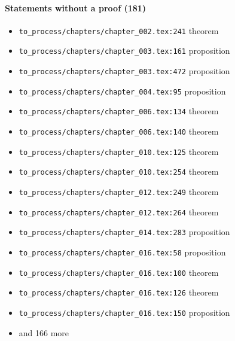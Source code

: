 \documentclass[11pt]{article}
\newcommand{\loc}[1]{{\small\color{muted}\texttt{#1}}}
\begin{document}
\paragraph{Statements without a proof (181)}
\begin{itemize}
\item \loc{to\_process/\allowbreak{}chapters/\allowbreak{}chapter\_002.tex:241} theorem
\item \loc{to\_process/\allowbreak{}chapters/\allowbreak{}chapter\_003.tex:161} proposition
\item \loc{to\_process/\allowbreak{}chapters/\allowbreak{}chapter\_003.tex:472} proposition
\item \loc{to\_process/\allowbreak{}chapters/\allowbreak{}chapter\_004.tex:95} proposition
\item \loc{to\_process/\allowbreak{}chapters/\allowbreak{}chapter\_006.tex:134} theorem
\item \loc{to\_process/\allowbreak{}chapters/\allowbreak{}chapter\_006.tex:140} theorem
\item \loc{to\_process/\allowbreak{}chapters/\allowbreak{}chapter\_010.tex:125} theorem
\item \loc{to\_process/\allowbreak{}chapters/\allowbreak{}chapter\_010.tex:254} theorem
\item \loc{to\_process/\allowbreak{}chapters/\allowbreak{}chapter\_012.tex:249} theorem
\item \loc{to\_process/\allowbreak{}chapters/\allowbreak{}chapter\_012.tex:264} theorem
\item \loc{to\_process/\allowbreak{}chapters/\allowbreak{}chapter\_014.tex:283} proposition
\item \loc{to\_process/\allowbreak{}chapters/\allowbreak{}chapter\_016.tex:58} proposition
\item \loc{to\_process/\allowbreak{}chapters/\allowbreak{}chapter\_016.tex:100} theorem
\item \loc{to\_process/\allowbreak{}chapters/\allowbreak{}chapter\_016.tex:126} theorem
\item \loc{to\_process/\allowbreak{}chapters/\allowbreak{}chapter\_016.tex:150} proposition
\item[] {\color{muted}\small and 166 more}
\end{itemize}
\end{document}
